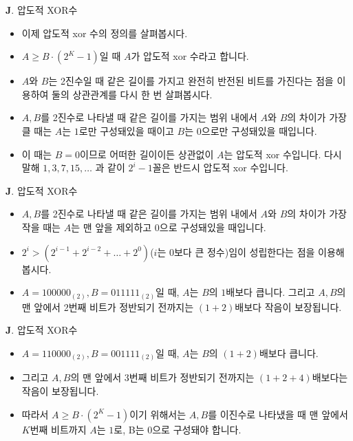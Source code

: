 \begin{frame}{\textbf{J}. 압도적 XOR수}
	\begin{itemize}
		\item 이제 압도적 xor 수의 정의를 살펴봅시다.
		\item $A \ge B \cdot (2^K - 1)$일 때 $A$가 압도적 xor 수라고 합니다. 
		\item $A$와 $B$는 2진수일 때 같은 길이를 가지고 완전히 반전된 비트를 가진다는 점을 이용하여 둘의 상관관계를 다시 한 번 살펴봅시다.
		\item $A, B$를 2진수로 나타낼 때 같은 길이를 가지는 범위 내에서 $A$와 $B$의 차이가 가장 클 때는 $A$는 $1$로만 구성돼있을 때이고 $B$는 $0$으로만 구성돼있을 때입니다. 
		\item 이 때는 $B = 0$이므로 어떠한 길이이든 상관없이 $A$는 압도적 xor 수입니다. 다시 말해 $1, 3, 7, 15, \dots$ 과 같이 $2^i - 1$꼴은 반드시 압도적 xor 수입니다.
	\end{itemize}
\end{frame}

\begin{frame}{\textbf{J}. 압도적 XOR수}
	\begin{itemize}
		\item $A, B$를 2진수로 나타낼 때 같은 길이를 가지는 범위 내에서 $A$와 $B$의 차이가 가장 작을 때는 $A$는 맨 앞을 제외하고 $0$으로 구성돼있을 때입니다. 
		\item $2^i > (2^{i-1} + 2^{i-2} + … + 2^0)$($i$는 0보다 큰 정수)임이 성립한다는 점을 이용해봅시다.
		\item $A = 100000_{(2)}, B = 011111_{(2)}$일 때, $A$는 $B$의 $1$배보다 큽니다. 그리고 $A, B$의 맨 앞에서 2번째 비트가 정반되기 전까지는 $(1+2)$배보다 작음이 보장됩니다.
	\end{itemize}
\end{frame}

\begin{frame}{\textbf{J}. 압도적 XOR수}
	\begin{itemize}
		\item $A = 110000_{(2)}, B = 001111_{(2)}$일 때, $A$는 $B$의 $(1+2)$배보다 큽니다. 
		\item 그리고 $A, B$의 맨 앞에서 3번째 비트가 정반되기 전까지는 $(1+2+4)$배보다는 작음이 보장됩니다.
		\item 따라서 $A \ge B \cdot (2^K - 1)$이기 위해서는 $A, B$를 이진수로 나타냈을 때 맨 앞에서 $K$번째 비트까지 $A$는 $1$로, B는 $0$으로 구성돼야 합니다. 
	\end{itemize}
\end{frame}

